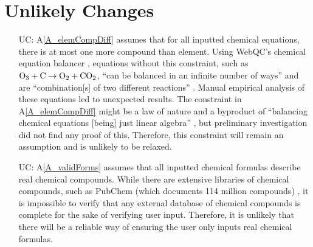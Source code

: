 \documentclass[12pt]{article}
\newcommand{\gdref}[1]{GD\ref{#1}}
\newcommand{\aref}[1]{A\ref{#1}}
\newcommand{\imref}[1]{IM\ref{#1}}
\newcounter{ucnum} %
\begin{document}
\section{Unlikely Changes} \label{sec_UCs}

\begin{itemize}


  \item[UC\refstepcounter{ucnum}\theucnum\label{UC_allEqsPermitted}:]
    \aref{A_elemCompDiff} assumes that for all inputted chemical equations,
    there is at most one more compound than element. Using WebQC's chemical
    equation balancer \cite{noauthor_balance_2023}, equations without this
    constraint, such as $\ce{O3} + \ce{C} \rightarrow \ce{O2} + \ce{CO2}$,
    ``can be balanced in an infinite number of ways'' and are
    ``combination[s] of two different reactions'' \cite{noauthor_balance_2023}.
    Manual empirical analysis of these equations led to unexpected results.
    The constraint in \aref{A_elemCompDiff} might be a law of nature and a
    byproduct of ``balancing chemical equations [being] just linear algebra''
    \cite[p.~193]{risteski_new_2021}, but preliminary investigation did not
    find any proof of this. Therefore, this constraint will remain an
    assumption and is unlikely to be relaxed.

  \item[UC\refstepcounter{ucnum}\theucnum\label{UC_checkValidForms}:]
    \aref{A_validForms} assumes that all inputted chemical formulas describe
    real chemical compounds. While there are extensive libraries of chemical
    compounds, such as PubChem (which documents 114 million compounds)
    \cite{national_center_for_biotechnology_information_pubchem_nodate}, it is
    impossible to verify that any external database of chemical compounds is
    complete for the sake of verifying user input. Therefore, it is unlikely
    that there will be a reliable way of ensuring the user only inputs real
    chemical formulas.


\end{itemize}
\end{document}
